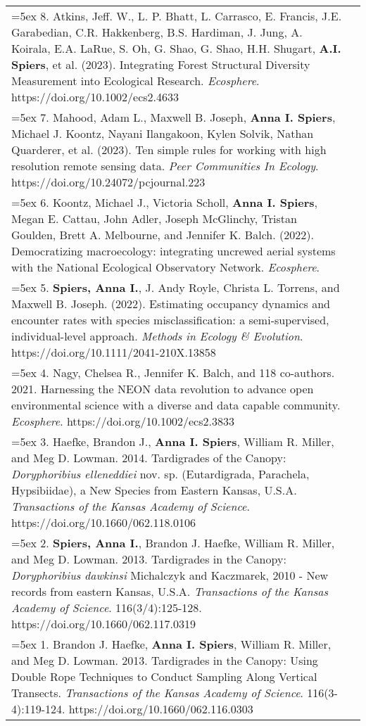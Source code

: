 \begin{longtable}{@{} >{\raggedright}p{6.10in} >{\raggedleft}X @{}}

\hangindent=5ex 8. Atkins, Jeff. W., L. P. Bhatt, L. Carrasco, E. Francis, J.E. Garabedian, C.R. Hakkenberg, B.S. Hardiman, J. Jung, A. Koirala, E.A. LaRue, S. Oh, G. Shao, G. Shao, H.H. Shugart, \textbf{A.I. Spiers}, et al. (2023). Integrating Forest Structural Diversity Measurement into Ecological Research. \emph{Ecosphere}. https://doi.org/10.1002/ecs2.4633 & \tabularnewline

\hangindent=5ex 7. Mahood, Adam L., Maxwell B. Joseph, \textbf{Anna I. Spiers}, Michael J. Koontz, Nayani Ilangakoon, Kylen Solvik, Nathan Quarderer, et al. (2023). Ten simple rules for working with high resolution remote sensing data. \emph{Peer Communities In Ecology}. https://doi.org/10.24072/pcjournal.223 & \tabularnewline

\hangindent=5ex 6. Koontz, Michael J., Victoria Scholl, \textbf{Anna I. Spiers}, Megan E. Cattau, John Adler, Joseph McGlinchy, Tristan Goulden, Brett A. Melbourne, and Jennifer K. Balch. (2022). Democratizing macroecology: integrating uncrewed aerial systems with the National Ecological Observatory Network. \emph{Ecosphere}.  &  \tabularnewline

\hangindent=5ex 5. \textbf{Spiers, Anna I.}, J. Andy Royle, Christa L. Torrens, and Maxwell B. Joseph. (2022). Estimating occupancy dynamics and encounter rates with species misclassification: a semi-supervised, individual-level approach. \emph{Methods in Ecology \& Evolution}. https://doi.org/10.1111/2041-210X.13858  &  \tabularnewline

\hangindent=5ex 4. Nagy, Chelsea R., Jennifer K. Balch, and 118 co-authors. 2021. Harnessing the NEON data revolution to advance open environmental science with a diverse and data capable community. \emph{Ecosphere}. https://doi.org/10.1002/ecs2.3833  &  \tabularnewline

\hangindent=5ex 3. Haefke, Brandon J., \textbf{Anna I. Spiers}, William R. Miller, and Meg D. Lowman. 2014. Tardigrades of the Canopy: \emph{Doryphoribius elleneddiei} nov. sp. (Eutardigrada, Parachela, Hypsibiidae), a New Species from Eastern Kansas, U.S.A. \emph{Transactions of the Kansas Academy of Science}. https://doi.org/10.1660/062.118.0106  &  \tabularnewline

\hangindent=5ex 2. \textbf{Spiers, Anna I.}, Brandon J. Haefke, William R. Miller, and Meg D. Lowman. 2013. Tardigrades in the Canopy: \emph{Doryphoribius dawkinsi} Michalczyk and Kaczmarek, 2010 - New records from eastern Kansas, U.S.A. \emph{Transactions of the Kansas Academy of Science}. 116(3/4):125-128. https://doi.org/10.1660/062.117.0319  &  \tabularnewline

\hangindent=5ex 1. Brandon J. Haefke, \textbf{Anna I. Spiers}, William R. Miller, and Meg D. Lowman. 2013. Tardigrades in the Canopy: Using Double Rope Techniques to Conduct Sampling Along Vertical Transects. \emph{Transactions of the Kansas Academy of Science}. 116(3-4):119-124. https://doi.org/10.1660/062.116.0303  &  \tabularnewline

\end{longtable}

